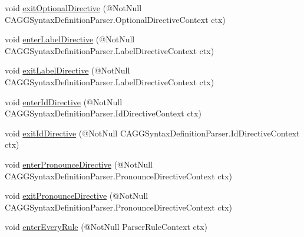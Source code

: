 \begin{DoxyCompactItemize}
\item 
void \hyperlink{classit_1_1emarolab_1_1cagg_1_1core_1_1language_1_1parser_1_1ANTLRInterface_1_1ANTLRGenerated_1_1a45b55289931e185944c10a916c8cdd_ad41e053c3d97b8aa6a7c98c9c195579d}{exit\-Optional\-Directive} (@Not\-Null C\-A\-G\-G\-Syntax\-Definition\-Parser.\-Optional\-Directive\-Context ctx)
\item 
void \hyperlink{classit_1_1emarolab_1_1cagg_1_1core_1_1language_1_1parser_1_1ANTLRInterface_1_1ANTLRGenerated_1_1a45b55289931e185944c10a916c8cdd_a2aa041a56be71cac5f039aac6459cd64}{enter\-Label\-Directive} (@Not\-Null C\-A\-G\-G\-Syntax\-Definition\-Parser.\-Label\-Directive\-Context ctx)
\item 
void \hyperlink{classit_1_1emarolab_1_1cagg_1_1core_1_1language_1_1parser_1_1ANTLRInterface_1_1ANTLRGenerated_1_1a45b55289931e185944c10a916c8cdd_a7219c52a7bf0caf869e67b75cc841c1f}{exit\-Label\-Directive} (@Not\-Null C\-A\-G\-G\-Syntax\-Definition\-Parser.\-Label\-Directive\-Context ctx)
\item 
void \hyperlink{classit_1_1emarolab_1_1cagg_1_1core_1_1language_1_1parser_1_1ANTLRInterface_1_1ANTLRGenerated_1_1a45b55289931e185944c10a916c8cdd_ab9a51bdf6e1ef6fda635d10e0f662b71}{enter\-Id\-Directive} (@Not\-Null C\-A\-G\-G\-Syntax\-Definition\-Parser.\-Id\-Directive\-Context ctx)
\item 
void \hyperlink{classit_1_1emarolab_1_1cagg_1_1core_1_1language_1_1parser_1_1ANTLRInterface_1_1ANTLRGenerated_1_1a45b55289931e185944c10a916c8cdd_a7aa233f74821a596a114a9623393d135}{exit\-Id\-Directive} (@Not\-Null C\-A\-G\-G\-Syntax\-Definition\-Parser.\-Id\-Directive\-Context ctx)
\item 
void \hyperlink{classit_1_1emarolab_1_1cagg_1_1core_1_1language_1_1parser_1_1ANTLRInterface_1_1ANTLRGenerated_1_1a45b55289931e185944c10a916c8cdd_a97182d4f5b68bc97ac6e3b2ea85ba9a5}{enter\-Pronounce\-Directive} (@Not\-Null C\-A\-G\-G\-Syntax\-Definition\-Parser.\-Pronounce\-Directive\-Context ctx)
\item 
void \hyperlink{classit_1_1emarolab_1_1cagg_1_1core_1_1language_1_1parser_1_1ANTLRInterface_1_1ANTLRGenerated_1_1a45b55289931e185944c10a916c8cdd_abdd50348766a1232c5e17f28b5efcf6f}{exit\-Pronounce\-Directive} (@Not\-Null C\-A\-G\-G\-Syntax\-Definition\-Parser.\-Pronounce\-Directive\-Context ctx)
\item 
void \hyperlink{classit_1_1emarolab_1_1cagg_1_1core_1_1language_1_1parser_1_1ANTLRInterface_1_1ANTLRGenerated_1_1a45b55289931e185944c10a916c8cdd_aa1aca96f55567d57bca7982f9f600298}{enter\-Every\-Rule} (@Not\-Null Parser\-Rule\-Context ctx)

\end{DoxyCompactItemize}
